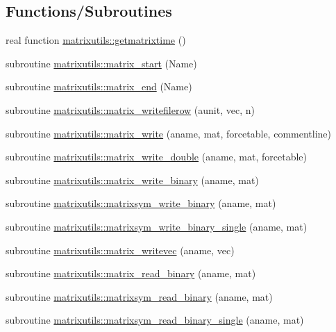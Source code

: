\subsection*{Functions/\+Subroutines}
\begin{DoxyCompactItemize}
\item 
real function \mbox{\hyperlink{namespacematrixutils_a969773017c47f3dc8dfb2a18e5bc5fbd}{matrixutils\+::getmatrixtime}} ()
\item 
subroutine \mbox{\hyperlink{namespacematrixutils_a24fd4fc8dbd7eee3c9176c3f9ca634eb}{matrixutils\+::matrix\+\_\+start}} (Name)
\item 
subroutine \mbox{\hyperlink{namespacematrixutils_aeb25ca6b661aed4516c029f0cd6003bc}{matrixutils\+::matrix\+\_\+end}} (Name)
\item 
subroutine \mbox{\hyperlink{namespacematrixutils_a88175f31021d0939c32287595d3f5630}{matrixutils\+::matrix\+\_\+writefilerow}} (aunit, vec, n)
\item 
subroutine \mbox{\hyperlink{namespacematrixutils_af21f52b4eeb7fc47bb9cd5e35cc1ebc8}{matrixutils\+::matrix\+\_\+write}} (aname, mat, forcetable, commentline)
\item 
subroutine \mbox{\hyperlink{namespacematrixutils_aa5eb3cbf41718ad7ccb335e642a29174}{matrixutils\+::matrix\+\_\+write\+\_\+double}} (aname, mat, forcetable)
\item 
subroutine \mbox{\hyperlink{namespacematrixutils_a5897a3508757971da56e07e3cdab7f0a}{matrixutils\+::matrix\+\_\+write\+\_\+binary}} (aname, mat)
\item 
subroutine \mbox{\hyperlink{namespacematrixutils_ac49e65871c4266da9c687b474d1908d8}{matrixutils\+::matrixsym\+\_\+write\+\_\+binary}} (aname, mat)
\item 
subroutine \mbox{\hyperlink{namespacematrixutils_acbfa12c533184738072f7f9a35e7cfc7}{matrixutils\+::matrixsym\+\_\+write\+\_\+binary\+\_\+single}} (aname, mat)
\item 
subroutine \mbox{\hyperlink{namespacematrixutils_a122e85102b3eac4266a8031c62de9bbf}{matrixutils\+::matrix\+\_\+writevec}} (aname, vec)
\item 
subroutine \mbox{\hyperlink{namespacematrixutils_a311afaea7a3204cc1b47a2adb7bebe63}{matrixutils\+::matrix\+\_\+read\+\_\+binary}} (aname, mat)
\item 
subroutine \mbox{\hyperlink{namespacematrixutils_a7572f4e0a0c8b958126d5d3c8b46f16a}{matrixutils\+::matrixsym\+\_\+read\+\_\+binary}} (aname, mat)
\item 
subroutine \mbox{\hyperlink{namespacematrixutils_a592726195f2a952a006391bde92cd2b0}{matrixutils\+::matrixsym\+\_\+read\+\_\+binary\+\_\+single}} (aname, mat)

\end{DoxyCompactItemize}
